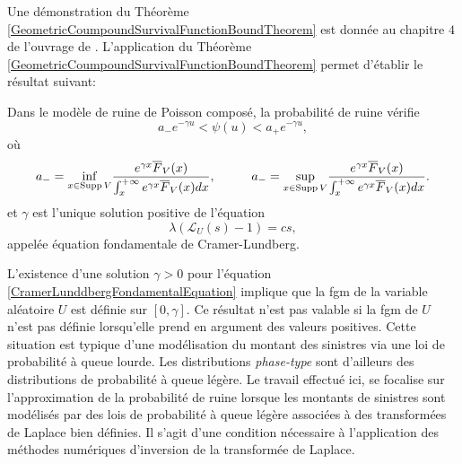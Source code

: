 Une démonstration du Théorème \ref{GeometricCoumpoundSurvivalFunctionBoundTheorem} est donnée au chapitre $4$ de l'ouvrage de \citet{RoScScTe99}. L'application du Théorème \ref{GeometricCoumpoundSurvivalFunctionBoundTheorem} permet d\rq{}établir le résultat suivant:
\begin{Cor}\label{CRamerLundbergBoundRuinProbability}
Dans le modèle de ruine de Poisson composé, la probabilité de ruine vérifie 
\begin{equation}\label{RuinProbabilityBoundEquation}
a_{-}e^{-\gamma u}<\psi(u)<a_{+}e^{-\gamma u},
\end{equation}
où
\begin{equation}
a_{-}=\underset{x\in\text{Supp}\hspace{0.05cm}V}{\inf}\frac{e^{\gamma x}\overline{F}_{V}(x)}{\int_{x}^{+\infty}e^{\gamma x}\overline{F}_{V}(x)dx},\hspace{1cm} a_{-}=\underset{x\in\text{Supp}\hspace{0.05cm}V}{\sup}\frac{e^{\gamma x}\overline{F}_{V}(x)}{\int_{x}^{+\infty}e^{\gamma x}\overline{F}_{V}(x)dx}.
\end{equation}
et $\gamma$ est l'unique solution positive de l'équation
\begin{equation}\label{CramerLunddbergFondamentalEquation}
\lambda\left(\mathcal{L}_{U}(s)-1\right)=cs,
\end{equation}
appelée équation fondamentale de Cramer-Lundberg. 
\end{Cor}
L'existence d'une solution $\gamma>0$ pour l'équation \eqref{CramerLunddbergFondamentalEquation} implique que la \gls{fgm} de la variable aléatoire $U$ est définie sur $[0,\gamma]$. Ce résultat n\rq{}est pas valable si la \gls{fgm} de $U$ n\rq{}est pas définie lorsqu\rq{}elle prend en argument des valeurs positives. Cette situation est typique d'une modélisation du montant des sinistres via une loi de probabilité à queue lourde. Les distributions \textit{phase-type} sont d'ailleurs des distributions de probabilité à queue légère. Le travail effectué ici, se focalise sur l'approximation de la probabilité de ruine lorsque les montants de sinistres sont modélisés par des lois de probabilité à queue légère associées à des transformées de Laplace bien définies. Il s\rq{}agit d\rq{}une condition nécessaire à l\rq{}application des méthodes numériques d\rq{}inversion de la transformée de Laplace. 
